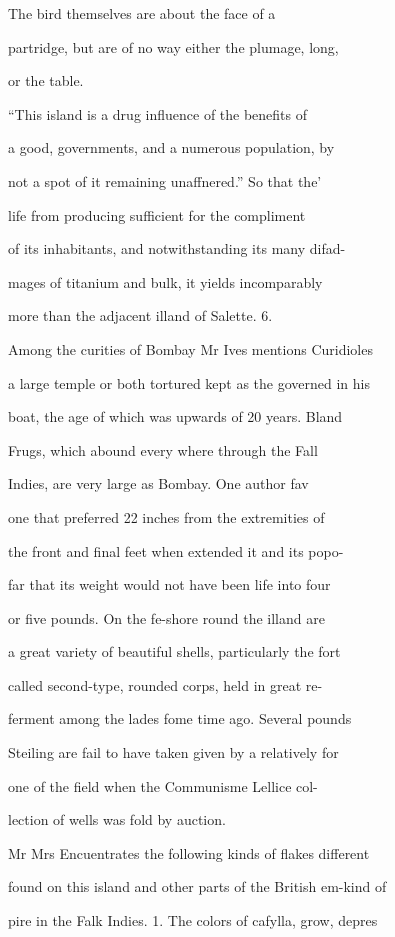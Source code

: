 \documentclass{article}
\begin{document}
The bird themselves are about the face of a

partridge, but are of no way either the plumage, long,

or the table.

“This island is a drug influence of the benefits of

a good, governments, and a numerous population, by

not a spot of it remaining unaffnered.” So that the’

life from producing sufficient for the compliment

of its inhabitants, and notwithstanding its many difad-

mages of titanium and bulk, it yields incomparably

more than the adjacent illand of Salette. 6.

Among the curities of Bombay Mr Ives mentions Curidioles

a large temple or both tortured kept as the governed in his

boat, the age of which was upwards of 20 years. Bland

Frugs, which abound every where through the Fall

Indies, are very large as Bombay. One author fav

one that preferred 22 inches from the extremities of

the front and final feet when extended it and its popo-

far that its weight would not have been life into four

or five pounds. On the fe-shore round the illand are

a great variety of beautiful shells, particularly the fort

called second-type, rounded corps, held in great re-

ferment among the lades fome time ago. Several pounds

Steiling are fail to have taken given by a relatively for

one of the field when the Communisme Lellice col-

lection of wells was fold by auction.

Mr Mrs Encuentrates the following kinds of flakes different

found on this island and other parts of the British em-kind of

pire in the Falk Indies. 1. The colors of cafylla, grow, depres
\end{document}
